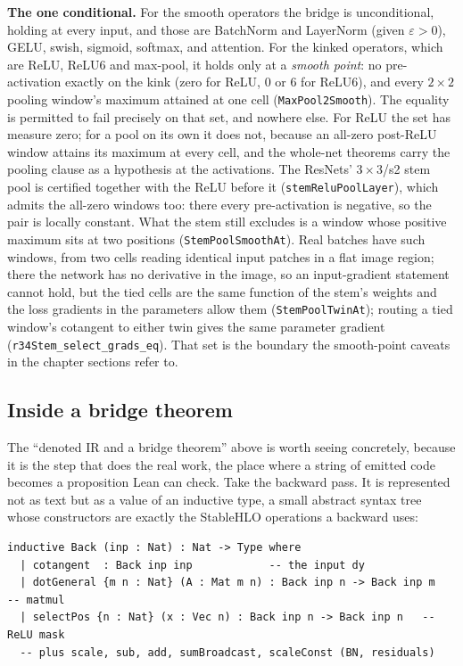 \medskip\noindent\textbf{The one conditional.} For the smooth operators the
bridge is unconditional, holding at every input, and those are BatchNorm and
LayerNorm (given $\varepsilon > 0$), GELU, swish, sigmoid, softmax, and
attention. For the kinked operators, which are ReLU, ReLU6 and max-pool, it
holds only at a \emph{smooth point}: no pre-activation exactly on the kink
(zero for ReLU, $0$ or $6$ for ReLU6), and every $2 \times 2$ pooling
window's maximum attained at one cell (\texttt{MaxPool2Smooth}). The equality
is permitted to fail precisely on that set, and nowhere else. For ReLU the set
has measure zero; for a pool on its own it does not, because an all-zero
post-ReLU window attains its maximum at every cell, and the whole-net theorems
carry the pooling clause as a hypothesis at the activations. The ResNets'
$3 \times 3$/s2 stem pool is certified together with the ReLU before it
(\texttt{stemReluPoolLayer}), which admits the all-zero windows too: there
every pre-activation is negative, so the pair is locally constant. What the
stem still excludes is a window whose positive maximum sits at two positions
(\texttt{StemPoolSmoothAt}). Real batches have such windows, from two cells
reading identical input patches in a flat image region; there the network has
no derivative in the image, so an input-gradient statement cannot hold, but the
tied cells are the same function of the stem's weights and the loss gradients
in the parameters allow them (\texttt{StemPoolTwinAt}); routing a tied
window's cotangent to either twin gives the same parameter gradient
(\texttt{r34Stem\_select\_grads\_eq}). That set is the
boundary the smooth-point caveats in the chapter sections refer to.

\subsection{Inside a bridge theorem}
\label{sec:inside_bridge}

The ``denoted IR and a bridge theorem'' above is worth seeing concretely,
because it is the step that does the real work, the place where a string of
emitted code becomes a proposition Lean can check. Take the backward pass. It
is represented not as text but as a value of an inductive type, a small
abstract syntax tree whose constructors are exactly the StableHLO operations a
backward uses:

\begin{verbatim}
inductive Back (inp : Nat) : Nat -> Type where
  | cotangent  : Back inp inp            -- the input dy
  | dotGeneral {m n : Nat} (A : Mat m n) : Back inp n -> Back inp m   -- matmul
  | selectPos {n : Nat} (x : Vec n) : Back inp n -> Back inp n   -- ReLU mask
  -- plus scale, sub, add, sumBroadcast, scaleConst (BN, residuals)
\end{verbatim}


